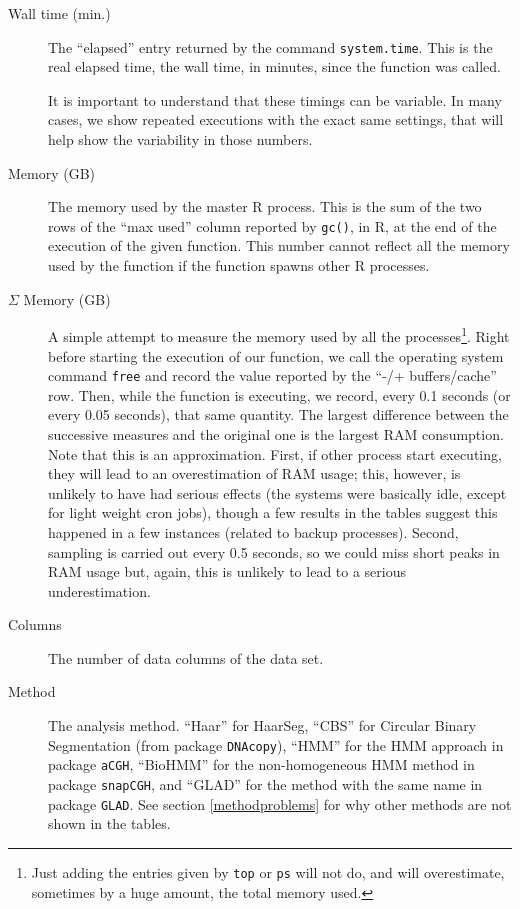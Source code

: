\documentclass[a4paper,11pt]{article}
\begin{document}
\begin{description}

\item[Wall time (min.)] The ``elapsed'' entry returned by the command
  \texttt{system.time}. This is the real elapsed time, the wall time, in
  minutes, since the function was called.
  
  It is important to understand that these timings can be variable. In
  many cases, we show repeated executions with the exact same settings,
  that will help show the variability in those numbers.

\item[Memory (GB)] The memory used by the master R process. This is the
  sum of the two rows of the ``max used'' column reported by
  \texttt{gc()}, in R, at the end of the execution of the given
  function. This number cannot reflect all the memory used by the function
  if the function spawns other R processes. 

\item[$\Sigma$ Memory (GB)] A simple attempt to measure the memory used by
  all the processes\footnote{Just adding the entries given by \texttt{top}
    or \texttt{ps} will not do, and will overestimate, sometimes by a huge
    amount, the total memory used.}. Right before starting the execution
  of our function, we call the operating system command \texttt{free} and
  record the value reported by the ``-/+ buffers/cache'' row. Then, while
  the function is executing, we record, every 0.1 seconds (or every 0.05
  seconds), that same quantity. The largest difference between the
  successive measures and the original one is the largest RAM
  consumption. Note that this is an approximation. First, if other process
  start executing, they will lead to an overestimation of RAM usage; this,
  however, is unlikely to have had serious effects (the systems were
  basically idle, except for light weight cron jobs), though a few results
  in the tables suggest this happened in a few instances (related to
  backup processes). Second, sampling is carried out every 0.5 seconds, so
  we could miss short peaks in RAM usage but, again, this is unlikely to
  lead to a serious underestimation.
  
  \item[Columns] The number of data columns of the data set.
  \item[Method] The analysis method. ``Haar'' for HaarSeg, ``CBS'' for
    Circular Binary Segmentation (from package \texttt{DNAcopy}), ``HMM''
    for the HMM approach in package \texttt{aCGH}, ``BioHMM'' for the
    non-homogeneous HMM method in package \texttt{snapCGH}, and ``GLAD''
    for the method with the same name in package \texttt{GLAD}. See 
    section \ref{methodproblems} for why other methods are not shown in
    the tables.



\end{description}
\end{document}
